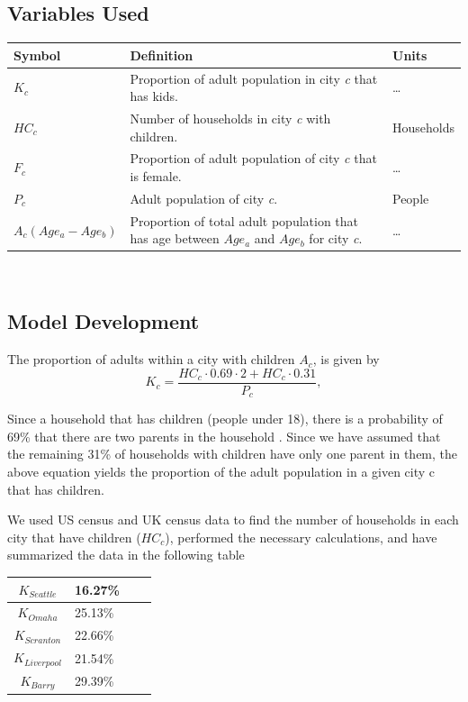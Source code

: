 \documentclass{article}
\begin{document}
\subsection{Variables Used}
\begin{table}[h]
\centering
\begin{tabularx}{\linewidth}{|l|>{\raggedright\arraybackslash}X|>{\raggedright\arraybackslash}X|}
\hline
    \textbf{Symbol} & \textbf{Definition} & \textbf{Units} \\
    \hline
    $K_c$ & Proportion of adult population in city \textit{c} that has kids. & \dots   \\
    \hline
    $HC_c$ & Number of households in city \textit{c} with children. & Households \\
    \hline
    $F_c$ & Proportion of adult population of city \textit{c} that is female. & \dots \\
    \hline
    $P_c$ & Adult population of city \textit{c}. & People \\
    \hline
    $A_c(Age_a-Age_b)$ & Proportion of total adult population that has age between $Age_a$ and $Age_b$ for city \textit{c}. & \dots \\ \hline
\end{tabularx}
\end{table}

\

\subsection{Model Development}
The proportion of adults within a city with children $A_c$, is given by
\[
K_c = \frac{HC_c \cdot 0.69 \cdot 2 + HC_c \cdot 0.31}{P_c},
\]

Since a household that has children (people under 18), there is a probability of 69\% that there are two parents in the household \cite{bureau_2021}. Since we have assumed that the remaining 31\% of households with children have only one parent in them, the above equation yields the proportion of the adult population in a given city c that has children.

We used US census and UK census data to find the number of households in each city that have children ($HC_c$), performed the necessary calculations, and have summarized the data in the following table
\begin{table}[ht]
\centering
\begin{tabularx}{37mm}{|c|X|c|X|}
\hline
    $K_{Seattle}$ & 16.27\% \\ \hline
    $K_{Omaha}$ & 25.13\% \\ \hline
    $K_{Scranton}$ & 22.66\% \\ \hline
    $K_{Liverpool}$ & 21.54\% \\ \hline
    $K_{Barry}$ & 29.39\% \\ \hline
\end{tabularx}
\end{table}
\end{document}
